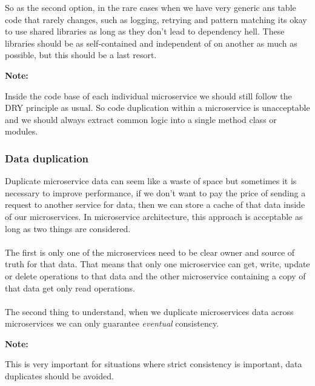 \documentclass[a4paper, 11pt]{book}
\newenvironment{note}{
    \begin{siderule}
        \textbf{Note: }
        }{
    \end{siderule}}
\begin{document}
    So as the second option, in the rare cases when we have very generic ans table code that rarely changes, such as logging, retrying and pattern matching its okay to use shared libraries as long as they don't lead to dependency hell.
    These libraries should be as self-contained and independent of on another as much as possible, but this should be a last resort.

    \begin{note}
        Inside the code base of each individual microservice we should still follow the DRY principle as usual.
        So code duplication within a microservice is unacceptable and we should always extract common logic into a single method class or modules.
    \end{note}

    \subsubsection{Data duplication}
    Duplicate microservice data can seem like a waste of space but sometimes it is necessary to improve performance, if we don't want to pay the price of sending a request to another service for data, then we can store a cache of that data inside of our microservices.
    In microservice architecture, this approach is acceptable as long as two things are considered.

    \paragraph{}
    The first is only one of the microservices need to be clear owner and source of truth for that data.
    That means that only one microservice can get, write, update or delete operations to that data and the other microservice containing a copy of that data get only read operations.

    \paragraph{}
    The second thing to understand, when we duplicate microservices data across microservices we can only guarantee \textit{eventual} consistency.

    \begin{note}
        This is very important for situations where strict consistency is important, data duplicates should be avoided.
    \end{note}
\end{document}
